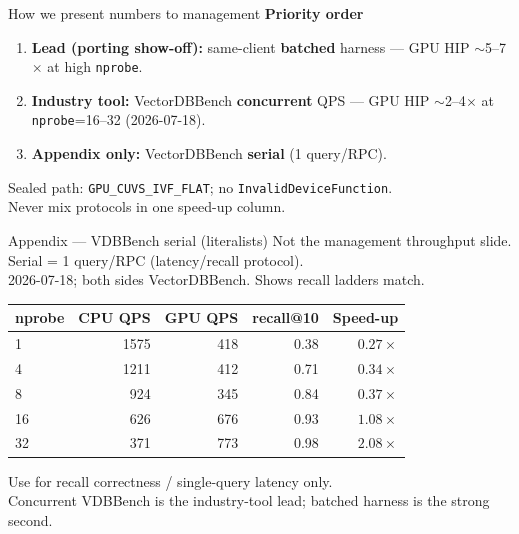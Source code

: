 
\begin{frame}{How we present numbers to management}
  \footnotesize
  \textbf{Priority order}
  \begin{enumerate}
    \item \textbf{Lead (porting show-off):} same-client \textbf{batched} harness
          --- GPU HIP $\sim$5--7$\times$ at high \texttt{nprobe}.
    \item \textbf{Industry tool:} VectorDBBench \textbf{concurrent} QPS
          --- GPU HIP $\sim$2--4$\times$ at \texttt{nprobe}=16--32 (2026-07-18).
    \item \textbf{Appendix only:} VectorDBBench \textbf{serial} (1 query/RPC).
  \end{enumerate}

  \vspace{0.4em}
  Sealed path: \texttt{GPU\_CUVS\_IVF\_FLAT}; no \texttt{InvalidDeviceFunction}.\\
  Never mix protocols in one speed-up column.
\end{frame}

\begin{frame}{Appendix --- VDBBench serial (literalists)}
  \footnotesize
  Not the management throughput slide. Serial = 1 query/RPC (latency/recall protocol).\\
  2026-07-18; both sides VectorDBBench. Shows recall ladders match.\\[0.25em]

  \begin{center}
  \begin{tabular}{@{}lrrrr@{}}
    \toprule
    \textbf{nprobe} & \textbf{CPU QPS} & \textbf{GPU QPS} & \textbf{recall@10} & \textbf{Speed-up} \\
    \midrule
    1  & 1575 & 418 & 0.38 & $0.27\times$ \\
    4  & 1211 & 412 & 0.71 & $0.34\times$ \\
    8  &  924 & 345 & 0.84 & $0.37\times$ \\
    16 &  626 & 676 & 0.93 & $1.08\times$ \\
    32 &  371 & 773 & 0.98 & $2.08\times$ \\
    \bottomrule
  \end{tabular}
  \end{center}

  \vspace{0.3em}
  Use for recall correctness / single-query latency only.\\
  Concurrent VDBBench is the industry-tool lead; batched harness is the strong second.
\end{frame}
